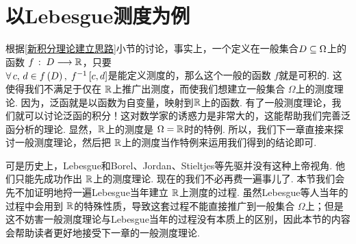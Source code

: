 \section{以Lebesgue测度为例}
根据\ref{新积分理论建立思路}小节的讨论，事实上，一个定义在一般集合$D\sb\Omega$上的函数 $f\,:\;D\ra\R$，只要\\ $\forall\,c,\,d\in f\z(D\y),\;f\inv\z[c,d\y] $是能定义测度的，那么这个一般的函数 $f$就是可积的. 这使得我们不满足于仅在 $\R$上推广出测度，而使我们想建立一般集合 $\Omega$上的测度理论. 因为，泛函就是以函数为自变量，映射到$\R$上的函数. 有了一般测度理论，我们就可以讨论泛函的积分！这对数学家的诱惑力是非常大的，这能帮助我们完善泛函分析的理论. 显然，$\R$上的测度是 $\Omega=\R$时的特例. 所以，我们下一章直接来探讨一般测度理论，然后把 $\R$上的测度当作特例来运用我们得到的结论即可.

可是历史上，Lebesgue和Borel、Jordan、Stieltjes等先驱并没有这种上帝视角. 他们只能先成功作出 $\R$上的测度理论. 现在的我们不必再费一遍事儿了. 本节我们会先不加证明地捋一遍Lebesgue当年建立 $\R$上测度的过程. 虽然Lebesgue等人当年的过程中会用到 $\R$的特殊性质，导致这套过程不能直接推广到一般集合 $\Omega$上；但是这不妨害一般测度理论与Lebesgue当年的过程没有本质上的区别，因此本节的内容会帮助读者更好地接受下一章的一般测度理论.
\vspace{0.5cm}

